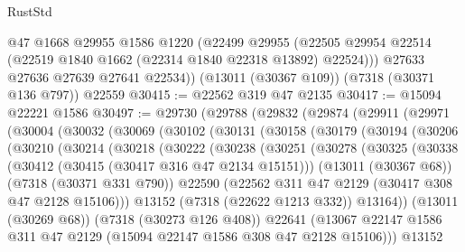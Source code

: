 \begin{lexlean}{RustStd}
\begin{coremodule}
        @47
        @1668
        @29955
        @1586
        @1220
        (@22499
          @29955
          (@22505 @29954 @22514 (@22519 @1840 @1662 (@22314 @1840 @22318 @13892) @22524)))
        @27633
        @27636
        @27639
        @27641
        @22534))
    (@13011 (@30367 @109))
    (@7318 (@30371 @136 @797))
    @22559
@30415 := @22562 @319 @47 @2135
@30417 := @15094 @22221 @1586
@30497 := @29730
    (@29788
      (@29832
        (@29874
          (@29911
            (@29971
              (@30004
                (@30032
                  (@30069
                    (@30102
                      (@30131
                        (@30158
                          (@30179
                            (@30194
                              (@30206
                                (@30210
                                  (@30214
                                    (@30218
                                      (@30222
                                        (@30238
                                          (@30251
                                            (@30278
                                              (@30325
                                                (@30338
                                                  (@30412 (@30415 (@30417 @316 @47 @2134 @15151)))
                                                  (@13011 (@30367 @68))
                                                  (@7318 (@30371 @331 @790))
                                                  @22590
                                                  (@22562
                                                    @311
                                                    @47
                                                    @2129
                                                    (@30417 @308 @47 @2128 @15106)))
                                                @13152
                                                (@7318 (@22622 @1213 @332))
                                                @13164))
                                            (@13011 (@30269 @68))
                                            (@7318 (@30273 @126 @408))
                                            @22641
                                            (@13067
                                              @22147
                                              @1586
                                              @311
                                              @47
                                              @2129
                                              (@15094 @22147 @1586 @308 @47 @2128 @15106)))
                                          @13152

\end{coremodule}
\end{lexlean}
